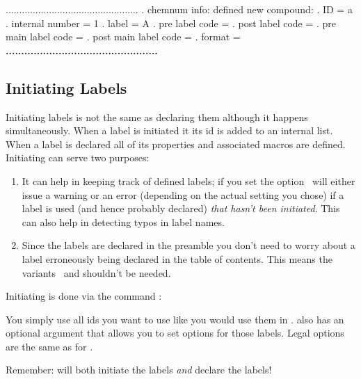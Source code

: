 \documentclass[load-preamble+,babel-options={ngerman,british,american}]{cnltx-doc}
\begin{document}
\begin{sourcecode}
  .................................................
  . chemnum info: defined new compound:
  .   ID = a
  .   internal number = 1
  .   label = A
  .   pre label code = 
  .   post label code = 
  .   pre main label code = 
  .   post main label code = 
  .   format = \bfseries 
  .................................................
\end{sourcecode}

\subsection{Initiating Labels}\label{sec:initiating-labels}
Initiating labels is not the same as declaring them although it happens
simultaneously.  When a label is initiated it its \ac{id} is added to an
internal list.  When a label is declared all of its properties and associated
macros are defined.  Initiating can serve two purposes:
\begin{enumerate}
  \item It can help in keeping track of defined labels; if you set the option
     \chemnum\ will either issue a warning or an error (depending 
    on the actual setting you chose) if a label is used (and hence probably
    declared) \emph{that hasn't been initiated}.  This can also help in
    detecting typos in label names.
  \item Since the labels are declared in the preamble you don't need to worry
    about a label erroneously being declared in the table of contents.  This
    means the variants \sarg\ and \code{+} shouldn't be
    needed.
\end{enumerate}

Initiating is done via the command :
\begin{sourcecode}
\end{sourcecode}
You simply use all \acsp{id} you want to use like you would use them in
.   also has an optional argument that allows you to set
options for those labels.  Legal options are the same as for .

Remember:  will both initiate the labels \emph{and} declare the
labels!
\end{document}
